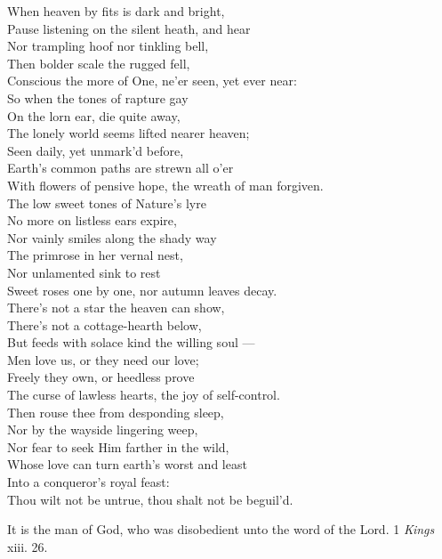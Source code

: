  When heaven by fits is dark and bright, \\
 Pause listening on the silent heath, and hear \\
 Nor trampling hoof nor tinkling bell, \\
 Then bolder scale the rugged fell, \\
 Conscious the more of One, ne’er seen, yet ever near: \\
  So when the tones of rapture gay \\
 On the lorn ear, die quite away, \\
 The lonely world seems lifted nearer heaven; \\
 Seen daily, yet unmark’d before, \\
 Earth’s common paths are strewn all o’er \\
 With flowers of pensive hope, the wreath of man forgiven. \\
  The low sweet tones of Nature’s lyre \\
 No more on listless ears expire, \\
 Nor vainly smiles along the shady way \\
 The primrose in her vernal nest, \\
 Nor unlamented sink to rest \\
 Sweet roses one by one, nor autumn leaves decay. \\
  There’s not a star the heaven can show, \\
 There’s not a cottage-hearth below, \\
 But feeds with solace kind the willing soul — \\
 Men love us, or they need our love; \\
 Freely they own, or heedless prove \\
 The curse of lawless hearts, the joy of self-control. \\
  Then rouse thee from desponding sleep, \\
 Nor by the wayside lingering weep, \\
 Nor fear to seek Him farther in the wild, \\
 Whose love can turn earth’s worst and least \\
 Into a conqueror’s royal feast: \\
 Thou wilt not be untrue, thou shalt not be beguil’d.\\


It is the man of God, who was disobedient unto the word of the Lord. 1 \emph{Kings} xiii. 26.

